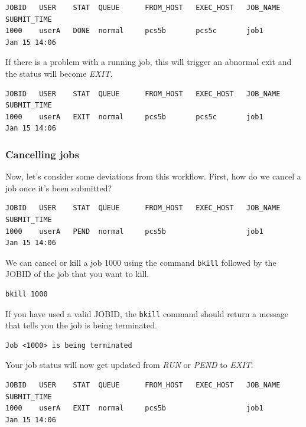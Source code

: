 \documentclass[11pt]{article}
\begin{document}
    \begin{verbatim}
JOBID   USER    STAT  QUEUE      FROM_HOST   EXEC_HOST   JOB_NAME   SUBMIT_TIME
1000    userA   DONE  normal     pcs5b       pcs5c       job1       Jan 15 14:06
\end{verbatim}

    If there is a problem with a running job, this will trigger an abnormal
exit and the status will become \textit{EXIT}.

    \begin{verbatim}
JOBID   USER    STAT  QUEUE      FROM_HOST   EXEC_HOST   JOB_NAME   SUBMIT_TIME
1000    userA   EXIT  normal     pcs5b       pcs5c       job1       Jan 15 14:06
\end{verbatim}

    \subsubsection{Cancelling jobs}\label{cancelling-jobs}

Now, let's consider some deviations from this workflow. First, how do we
cancel a job once it's been submitted?

    \begin{verbatim}
JOBID   USER    STAT  QUEUE      FROM_HOST   EXEC_HOST   JOB_NAME   SUBMIT_TIME
1000    userA   PEND  normal     pcs5b                   job1       Jan 15 14:06
\end{verbatim}

    We can cancel or kill a job 1000 using the command \texttt{bkill}
followed by the JOBID of the job that you want to kill.

    \begin{verbatim}
bkill 1000
\end{verbatim}

    If you have used a valid JOBID, the \texttt{bkill} command should return
a message that tells you the job is being terminated.

    \begin{verbatim}
Job <1000> is being terminated
\end{verbatim}

    Your job status will now get updated from \textit{RUN} or \textit{PEND} to
\textit{EXIT}.

    \begin{verbatim}
JOBID   USER    STAT  QUEUE      FROM_HOST   EXEC_HOST   JOB_NAME   SUBMIT_TIME
1000    userA   EXIT  normal     pcs5b                   job1       Jan 15 14:06
\end{verbatim}
\end{document}
